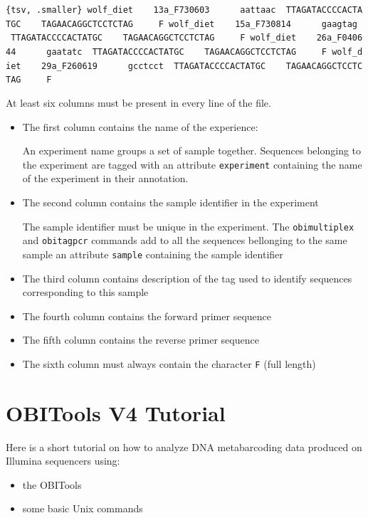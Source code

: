\documentclass[
  letterpaper,
  DIV=11,
  numbers=noendperiod]{scrreprt}
\providecommand{\tightlist}{%
  \setlength{\itemsep}{0pt}\setlength{\parskip}{0pt}}\usepackage{longtable,booktabs,array}
\begin{document}
\texttt{\{tsv,\ .smaller\}\ wolf\_diet\ \ \ \ 13a\_F730603\ \ \ \ \ \ aattaac\ \ TTAGATACCCCACTATGC\ \ \ \ TAGAACAGGCTCCTCTAG\ \ \ \ \ F\ wolf\_diet\ \ \ \ 15a\_F730814\ \ \ \ \ \ gaagtag\ \ TTAGATACCCCACTATGC\ \ \ \ TAGAACAGGCTCCTCTAG\ \ \ \ \ F\ wolf\_diet\ \ \ \ 26a\_F040644\ \ \ \ \ \ gaatatc\ \ TTAGATACCCCACTATGC\ \ \ \ TAGAACAGGCTCCTCTAG\ \ \ \ \ F\ wolf\_diet\ \ \ \ 29a\_F260619\ \ \ \ \ \ gcctcct\ \ TTAGATACCCCACTATGC\ \ \ \ TAGAACAGGCTCCTCTAG\ \ \ \ \ F}

At least six columns must be present in every line of the file.

\begin{itemize}
\item
  The first column contains the name of the experience:

  An experiment name groups a set of sample together. Sequences
  belonging to the experiment are tagged with an attribute
  \texttt{experiment} containing the name of the experiment in their
  annotation.
\item
  The second column contains the sample identifier in the experiment

  The sample identifier must be unique in the experiment. The
  \texttt{obimultiplex} and \texttt{obitagpcr} commands add to all the
  sequences bellonging to the same sample an attribute \texttt{sample}
  containing the sample identifier
\item
  The third column contains description of the tag used to identify
  sequences corresponding to this sample
\item
  The fourth column contains the forward primer sequence
\item
  The fifth column contains the reverse primer sequence
\item
  The sixth column must always contain the character \texttt{F} (full
  length)
\end{itemize}

\hypertarget{obitools-v4-tutorial}{%
\chapter{OBITools V4 Tutorial}\label{obitools-v4-tutorial}}

Here is a short tutorial on how to analyze DNA metabarcoding data
produced on Illumina sequencers using:

\begin{itemize}
\tightlist
\item
  the OBITools
\item
  some basic Unix commands
\end{itemize}
\end{document}
